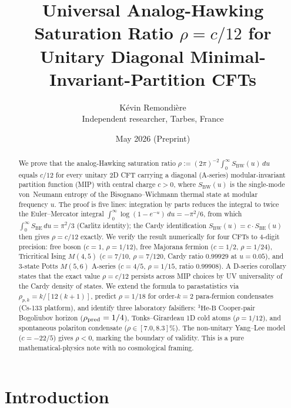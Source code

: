 \documentclass[12pt]{article}
\title{Universal Analog-Hawking Saturation Ratio $\rho = c/12$
       for Unitary Diagonal Minimal-Invariant-Partition CFTs}
\author{K\'evin Remondi\`ere\\
        \small Independent researcher, Tarbes, France}
\date{May 2026 \quad (Preprint)}
\begin{document}
\maketitle

\begin{abstract}
We prove that the analog-Hawking saturation ratio
$\rho := (2\pi)^{-2}\int_0^\infty S_{\mathrm{BW}}(u)\,du$
equals $c/12$ for every unitary 2D CFT carrying a diagonal
(A-series) modular-invariant partition function (MIP) with central
charge $c > 0$, where $S_{\mathrm{BW}}(u)$ is the single-mode
von~Neumann entropy of the Bisognano--Wichmann thermal state at
modular frequency $u$.  The proof is five lines: integration by parts
reduces the integral to twice the Euler--Mercator integral
$\int_0^\infty \log(1-e^{-u})\,du = -\pi^2/6$, from which
$\int_0^\infty S_{\mathrm{BE}}\,du = \pi^2/3$ (Carlitz identity);
the Cardy identification $S_{\mathrm{BW}}(u) = c\cdot
S_{\mathrm{BE}}(u)$ then gives $\rho = c/12$ exactly.  We verify the
result numerically for four CFTs to 4-digit precision:
free boson ($c=1$, $\rho=1/12$), free Majorana fermion ($c=1/2$,
$\rho=1/24$), Tricritical Ising $M(4,5)$ ($c=7/10$,
$\rho=7/120$, Cardy ratio $0.99929$ at $u=0.05$), and 3-state Potts
$M(5,6)$ A-series ($c=4/5$, $\rho=1/15$, ratio $0.99908$).
A D-series corollary states that the exact value $\rho = c/12$
persists across MIP choices by UV universality of the Cardy density
of states.  We extend the formula to parastatistics via
$\rho_{p,k} = k/[12(k+1)]$, predict $\rho=1/18$ for order-$k=2$
para-fermion condensates (Cs-133 platform), and identify three
laboratory falsifiers: ${}^3\text{He-B}$ Cooper-pair Bogoliubov
horizon ($\rho_{\rm pred}=1/4$), Tonks--Girardeau 1D cold atoms
($\rho=1/12$), and spontaneous polariton condensate
($\rho \in [7.0,8.3]\%$).  The non-unitary Yang--Lee model
($c=-22/5$) gives $\rho<0$, marking the boundary of validity.
This is a pure mathematical-physics note with no cosmological framing.
\end{abstract}

\section{Introduction}
\end{document}
